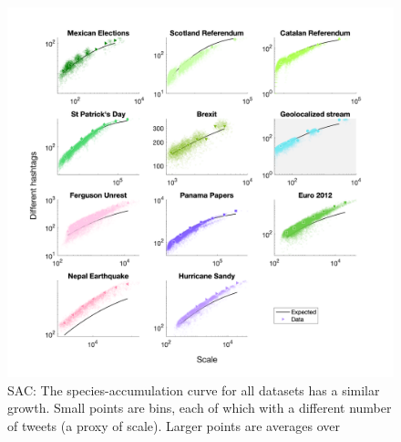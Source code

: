 \begin{figure}[h!]
    \centering
    \includegraphics[width=1.1\textwidth]{figures/chp4/SAC_tweet_RemSam.pdf}
    \caption[SAC]{SAC: The species-accumulation curve for all datasets has a similar growth. Small points are bins, each of which with a different number of tweets (a proxy of scale). Larger points are averages over }
    \label{fig:4:SAC}
\end{figure}



